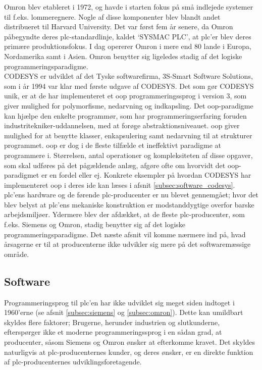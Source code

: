 \label{subsec:omron}
\noindent Omron blev etableret i 1972, og havde i starten fokus på små indlejede systemer til f.eks. lommeregnere. Nogle af disse komponenter blev blandt andet distribueret til Harvard University. Det var først fem år senere, da Omron påbegyndte deres \gls{plc}-standardlinje, kaldet \enquote*{SYSMAC PLC}, at \gls{plc}'er blev deres primære produktionsfokus. I dag opererer Omron i mere end 80 lande i Europa, Nordamerika samt i Asien\cite{plc-marked-shares}. Omron benytter sig ligeledes stadig af det logiske programmeringsparadigme.\\

\label{subsec:codesys}
\noindent CODESYS er udviklet af det Tyske softwarefirma, 3S-Smart Software Solutions, som i år 1994 var klar med første udgave af CODESYS. Det som gør CODESYS unik, er at de har implementeret et \gls{oop} programmeringssprog i version 3, som giver mulighed for polymorfisme, nedarvning og indkapsling. Det \gls{oop}-paradigme kan hjælpe den enkelte programmør, som har programmeringserfaring foruden industritekniker-uddannelsen, med at forøge abstraktionsniveauet. \gls{oop} giver mulighed for at benytte klasser, enkapsulering samt nedarvning til at strukturer programmet. \gls{oop} er dog i de fleste tilfælde et ineffektivt paradigme at programmere i. Størrelsen, antal operationer og kompleksiteten af disse opgaver, som skal udføres på det pågældende anlæg, afgøre ofte om hvorvidt det \gls{oop}-paradigmet er en fordel eller ej. Konkrete eksempler på hvordan CODESYS har implementeret \gls{oop} i deres \gls{ide} kan læses i afsnit \ref{subsec:software_codesys}. \\

\noindent \gls{plc}'ens hardware og de førende \gls{plc}-producenter er nu blevet gennemgået; hvor det blev belyst at \gls{plc}'ens mekaniske konstruktion er modstanddygtige overfor barske arbejdsmiljøer. Ydermere blev der afdækket, at de fleste \gls{plc}-producenter, som f.eks. Siemens og Omron, stadig benytter sig af det logiske programmeringsparadigme. Det næste afsnit vil komme nærmere ind på, hvad årsagerne er til at producenterne ikke udvikler sig mere på det softwaremæssige område.

\subsection{Software}
\label{subsec:plcsoftware}
Programmeringsprog til \gls{plc}'en har ikke udviklet sig meget siden indtoget i 1960'erne (se afsnit \ref{subsec:siemens} og \ref{subsec:omron}). Dette kan umildbart skyldes flere faktorer; Brugerne, herunder industrien og slutkunderne, efterspørger ikke et moderne programmeringssprog i en sådan grad, at producenter, såsom Siemens og Omron ønsker at efterkomme kravet. Det skyldes naturligvis at \gls{plc}-producenternes kunder, og deres ønsker, er en direkte funktion af \gls{plc}-producenternes udviklingsforetagende. \\

